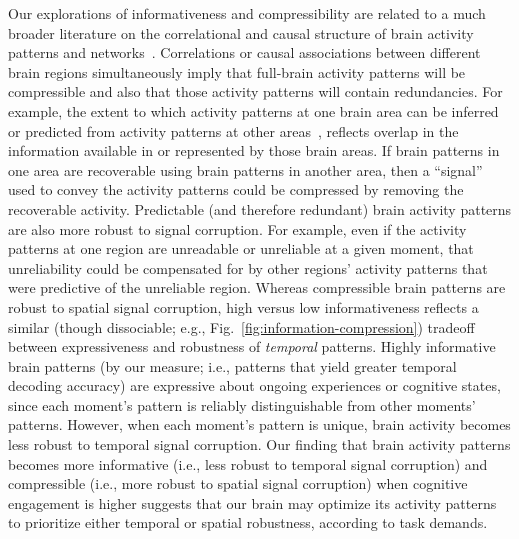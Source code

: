 \documentclass[english, 11pt]{article}
\begin{document}
Our explorations of informativeness and compressibility are related to a much
broader literature on the correlational and causal structure of brain activity
patterns and networks~\citep{PretEtal17, OwenEtal21, RogeEtal07, RubiSpor10,
SizeEtal18, SmitEtal13b, SmitEtal13c, SrinEtal07, TomaVolk11, YeoEtal11,
AdacEtal12, BassSpor17, BullSpor09, SporHone06, SporBetz16, SporZwi04,
DhamEtal08, KorzEtal08, BrovEtal04, LynnBass21}. Correlations or causal
associations between different brain regions simultaneously imply that
full-brain activity patterns will be compressible and also that those activity
patterns will contain redundancies. For example, the extent to which activity
patterns at one brain area can be inferred or predicted from activity patterns
at other areas~\citep[e.g.,][]{OwenEtal20, ScanEtal21}, reflects overlap in the
information available in or represented by those brain areas. If brain patterns
in one area are recoverable using brain patterns in another area, then a
``signal'' used to convey the activity patterns could be compressed by removing
the recoverable activity. Predictable (and therefore redundant) brain activity
patterns are also more robust to signal corruption. For example, even if the
activity patterns at one region are unreadable or unreliable at a given moment,
that unreliability could be compensated for by other regions' activity patterns
that were predictive of the unreliable region. Whereas compressible brain
patterns are robust to spatial signal corruption, high versus low
informativeness reflects a similar (though dissociable; e.g.,
Fig.~\ref{fig:information-compression}) tradeoff between expressiveness and
robustness of \textit{temporal} patterns. Highly informative brain patterns (by
our measure; i.e., patterns that yield greater temporal decoding accuracy) are
expressive about ongoing experiences or cognitive states, since each moment's
pattern is reliably distinguishable from other moments' patterns. However, when
each moment's pattern is unique, brain activity becomes less robust to temporal
signal corruption. Our finding that brain activity patterns becomes more
informative (i.e., less robust to temporal signal corruption) and compressible
(i.e., more robust to spatial signal corruption) when cognitive engagement is
higher suggests that our brain may optimize its activity patterns to prioritize
either temporal or spatial robustness, according to task demands.
\end{document}
